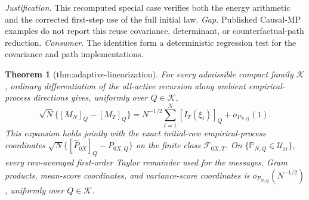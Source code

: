 \documentclass{article}
\newtheorem{theorem}{Theorem}
\begin{document}
\par\smallskip\noindent \textit{Justification.} This recomputed special case verifies both the energy arithmetic and the corrected first-step use of the full initial law. \textit{Gap.} Published Causal-MP examples do not report this reuse covariance, determinant, or counterfactual-path reduction. \textit{Consumer.} The identities form a deterministic regression test for the covariance and path implementations.

\begin{theorem}[thm:adaptive-linearization]\label{thm:adaptive-linearization}
For every admissible compact family \(\mathcal K\), ordinary differentiation of the all-active recursion along ambient empirical-process directions gives, uniformly over \(Q\in\mathcal K\),
\[
 \sqrt N\{[M_N]_Q-[M_T]_Q\}
 =N^{-1/2}\sum_{i=1}^N[I_T(\xi_i)]_Q+o_{P_{N,Q}}(1).
\]
This expansion holds jointly with the exact initial-row empirical-process coordinates \(\sqrt N\{[\widehat P_{0X}]_Q-P_{0X,Q}\}\) on the finite class \(\mathcal F_{0X,T}\).  On \(\{\mathbb P_{N,Q}\in\mathcal U_{\mathrm{rr}}\}\), every row-averaged first-order Taylor remainder used for the messages, Gram products, mean-score coordinates, and variance-score coordinates is \(o_{P_{N,Q}}(N^{-1/2})\), uniformly over \(Q\in\mathcal K\).
\end{theorem}
\end{document}
